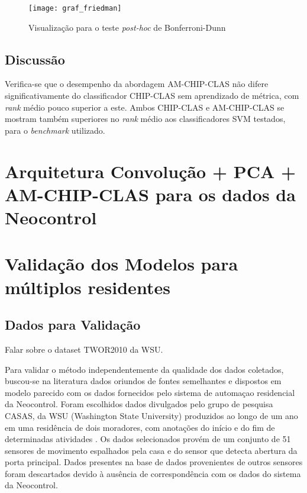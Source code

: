 \documentclass[
	12pt,				%
	openright,			%
	twoside,			%
	a4paper,			%
	english,			%
	spanish,			%
	brazil,				%
	]{abntex2}\usepackage[]{graphicx}\usepackage[]{color}
\begin{document}
\begin{figure}[ht]
\texttt{[image: graf\_friedman]}
\caption{Visualização para o teste \textit{post-hoc} de Bonferroni-Dunn}
\label{bonfe}
\end{figure}

\subsection{Discussão}

\par Verifica-se que o desempenho da abordagem AM-CHIP-CLAS não difere significativamente do classificador CHIP-CLAS sem aprendizado de métrica, com \textit{rank} médio pouco superior a este. Ambos CHIP-CLAS e AM-CHIP-CLAS se mostram também superiores no \textit{rank} médio aos classificadores SVM testados, para o \textit{benchmark} utilizado.

\section{Arquitetura Convolução + PCA + AM-CHIP-CLAS para os dados da Neocontrol}

\section{Validação dos Modelos para múltiplos residentes}

\subsection{Dados para Validação}

Falar sobre o dataset TWOR2010 da WSU.

Para validar o método independentemente da qualidade dos dados coletados, buscou-se na literatura dados oriundos de fontes semelhantes e dispostos em modelo parecido com os dados fornecidos pelo sistema de automaçao residencial da Neocontrol. Foram escolhidos dados divulgados pelo grupo de pesquisa CASAS, da WSU (Washington State University) produzidos ao longo de um ano em uma residência de dois moradores, com anotações do início e do fim de determinadas atividades \cite{Cook2009}. Os dados selecionados provém de um conjunto de 51 sensores de movimento espalhados pela casa e do sensor que detecta abertura da porta principal. Dados presentes na base de dados provenientes de outros sensores foram descartados devido à ausência de correspondência com os dados do sistema da Neocontrol.
\end{document}

